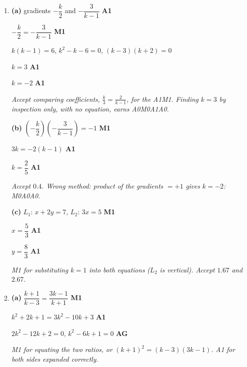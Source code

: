 \documentclass[12pt, twoside]{article}
\begin{document}
\begin{enumerate}[itemsep=0.3cm]

\item[1.] [Maximum mark: 10]

\textbf{(a)} gradients $-\dfrac{k}{2}$ and $-\dfrac{3}{k - 1}$ \hfill \textbf{A1}

$-\dfrac{k}{2} = -\dfrac{3}{k - 1}$ \hfill \textbf{M1}

$k(k - 1) = 6$, \quad $k^{2} - k - 6 = 0$, \quad $(k - 3)(k + 2) = 0$

$k = 3$ \hfill \textbf{A1}

$k = -2$ \hfill \textbf{A1}

\emph{Accept comparing coefficients, $\frac{k}{3} = \frac{2}{k - 1}$, for the
A1M1. Finding $k = 3$ by inspection only, with no equation, earns
A0M0A1A0.}

\textbf{(b)} $\left(-\dfrac{k}{2}\right)\left(-\dfrac{3}{k - 1}\right) = -1$ \hfill \textbf{M1}

$3k = -2(k - 1)$ \hfill \textbf{A1}

$k = \dfrac{2}{5}$ \hfill \textbf{A1}

\emph{Accept $0.4$. Wrong method: product of the gradients $= +1$ gives
$k = -2$: M0A0A0.}

\textbf{(c)} $L_{1}$: $x + 2y = 7$, \quad $L_{2}$: $3x = 5$ \hfill \textbf{M1}

$x = \dfrac{5}{3}$ \hfill \textbf{A1}

$y = \dfrac{8}{3}$ \hfill \textbf{A1}

\emph{M1 for substituting $k = 1$ into both equations ($L_{2}$ is vertical).
Accept $1.67$ and $2.67$.}

\newpage

\item[2.] [Maximum mark: 12]

\textbf{(a)} $\dfrac{k + 1}{k - 3} = \dfrac{3k - 1}{k + 1}$ \hfill \textbf{M1}

$k^{2} + 2k + 1 = 3k^{2} - 10k + 3$ \hfill \textbf{A1}

$2k^{2} - 12k + 2 = 0$, \quad $k^{2} - 6k + 1 = 0$ \hfill \textbf{AG}

\emph{M1 for equating the two ratios, or $(k + 1)^{2} = (k - 3)(3k - 1)$.
A1 for both sides expanded correctly.}


\end{enumerate}
\end{document}
